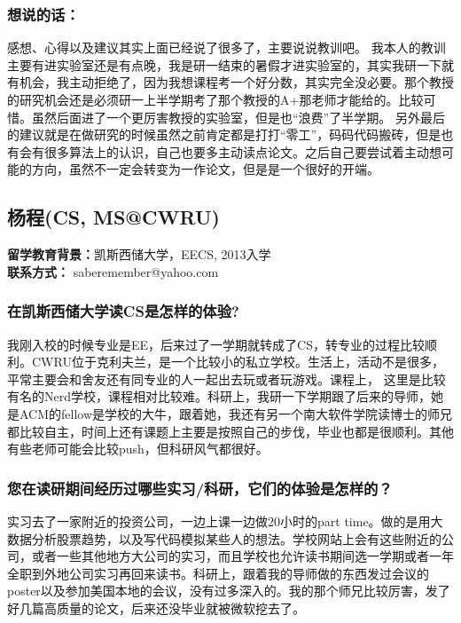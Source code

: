 \documentclass[a4paper,UTF8]{book}
\begin{document}
    \subsubsection{想说的话：}
    感想、心得以及建议其实上面已经说了很多了，主要说说教训吧。
    我本人的教训主要有进实验室还是有点晚，我是研一结束的暑假才进实验室的，其实我研一下就有机会，我主动拒绝了，因为我想课程考一个好分数，其实完全没必要。那个教授的研究机会还是必须研一上半学期考了那个教授的A+那老师才能给的。比较可惜。虽然后面进了一个更厉害教授的实验室，但是也“浪费”了半学期。
    另外最后的建议就是在做研究的时候虽然之前肯定都是打打“零工”，码码代码搬砖，但是也有会有很多算法上的认识，自己也要多主动读点论文。之后自己要尝试着主动想可能的方向，虽然不一定会转变为一作论文，但是是一个很好的开端。
     

\clearpage
\subsection{杨程(CS, MS@CWRU)}
    \textbf{留学教育背景：}凯斯西储大学，EECS, 2013入学\\
    \textbf{联系方式：} saberemember@yahoo.com

    \subsubsection*{在凯斯西储大学读CS是怎样的体验?}
    我刚入校的时候专业是EE，后来过了一学期就转成了CS，转专业的过程比较顺利。CWRU位于克利夫兰，是一个比较小的私立学校。生活上，活动不是很多，平常主要会和舍友还有同专业的人一起出去玩或者玩游戏。课程上， 这里是比较有名的Nerd学校，课程相对比较难。科研上，我研一下学期跟了后来的导师，她是ACM的fellow是学校的大牛，跟着她，我还有另一个南大软件学院读博士的师兄都比较自主，时间上还有课题上主要是按照自己的步伐，毕业也都是很顺利。其他有些老师可能会比较push，但科研风气都很好。
    
    \subsubsection*{您在读研期间经历过哪些实习/科研，它们的体验是怎样的？}
    实习去了一家附近的投资公司，一边上课一边做20小时的part time。做的是用大数据分析股票趋势，以及写代码模拟某些人的想法。学校网站上会有这些附近的公司，或者一些其他地方大公司的实习，而且学校也允许读书期间选一学期或者一年全职到外地公司实习再回来读书。科研上，跟着我的导师做的东西发过会议的poster以及参加美国本地的会议，没有过多深入的。我的那个师兄比较厉害，发了好几篇高质量的论文，后来还没毕业就被微软挖去了。
    
\end{document}
